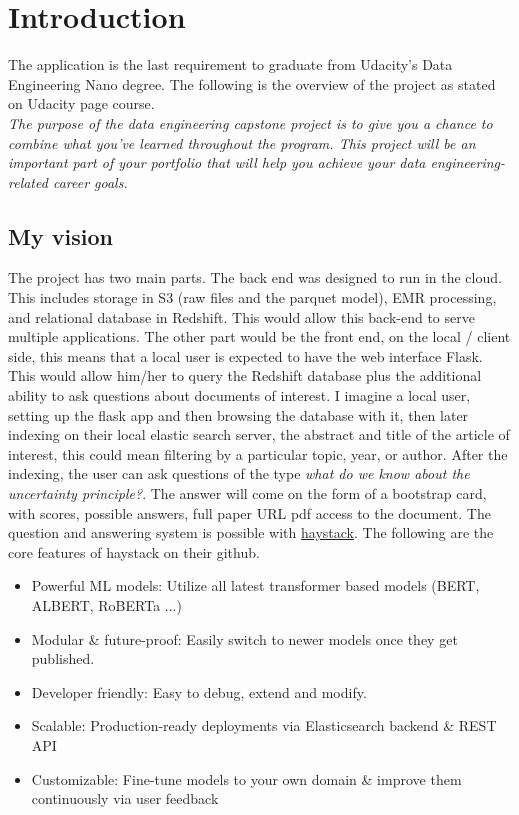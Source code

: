

\section{Introduction}

The application is the last requirement to graduate from Udacity's Data Engineering Nano degree. The following is
the overview of the project as stated on Udacity page course. \\

\emph{The purpose of the data engineering capstone project is to give you a chance to 
combine what you've learned throughout the program. This project will be an important part of 
your portfolio that will help you achieve your data engineering-related career goals.}


\subsection{My vision}
The project has two main parts. The back end was designed to run in the cloud. This includes storage in S3 (raw files and the parquet model), EMR processing, and relational database in Redshift. This would allow this back-end to serve multiple applications. The other part would be
the front end, on the local / client side, this means that a local user is expected to have the web interface Flask. This would allow him/her to query the Redshift database plus the additional ability to ask questions about documents of interest. I imagine a local user, setting up the flask app and then browsing the database with it, then later indexing on their local elastic search server, the abstract and title of the article of interest, this could mean
filtering by a particular topic, year, or author. After the indexing, the user can ask questions of the type \emph{what do we know about the uncertainty principle?}. The answer will come on the form of a bootstrap card, with scores, possible answers, full paper URL pdf access to the document. The question and answering system is possible with \href{https://github.com/deepset-ai/haystack}{haystack}. The following are the core features of haystack on their github.




\begin{itemize}
\item Powerful ML models: Utilize all latest transformer based models (BERT, ALBERT, RoBERTa ...)
\item Modular \& future-proof: Easily switch to newer models once they get published.
\item Developer friendly: Easy to debug, extend and modify.
\item Scalable: Production-ready deployments via Elasticsearch backend \& REST API
\item Customizable: Fine-tune models to your own domain \& improve them continuously via user feedback
\end{itemize}


    
    
    
    


